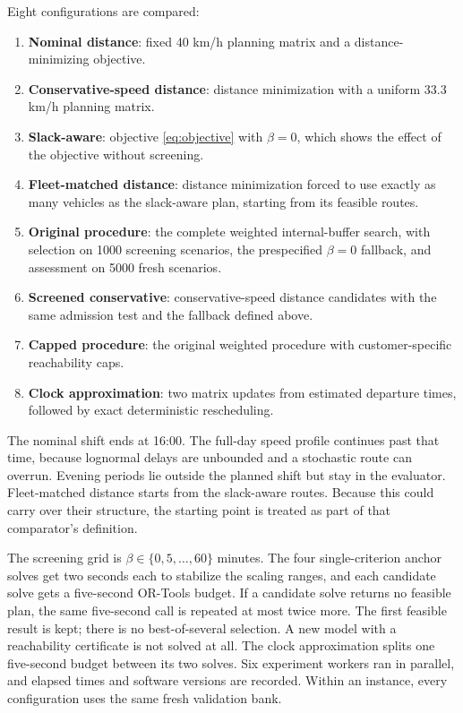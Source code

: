 \documentclass[11pt,a4paper]{article}
\begin{document}
Eight configurations are compared:
\begin{enumerate}
  \item \textbf{Nominal distance}: fixed 40 km/h planning matrix and a
        distance-minimizing objective.
  \item \textbf{Conservative-speed distance}: distance minimization with a
        uniform 33.3 km/h planning matrix.
  \item \textbf{Slack-aware}: objective \eqref{eq:objective} with $\beta=0$,
        which shows the effect of the objective without screening.
  \item \textbf{Fleet-matched distance}: distance minimization forced to use
        exactly as many vehicles as the slack-aware plan, starting from its
        feasible routes.
  \item \textbf{Original procedure}: the complete weighted internal-buffer search, with
        selection on 1000 screening scenarios, the prespecified $\beta=0$
        fallback, and assessment on 5000 fresh scenarios.
  \item \textbf{Screened conservative}: conservative-speed distance candidates
        with the same admission test and the fallback defined above.
  \item \textbf{Capped procedure}: the original weighted procedure with
        customer-specific reachability caps.
  \item \textbf{Clock approximation}: two matrix updates from estimated
        departure times, followed by exact deterministic rescheduling.
\end{enumerate}

The nominal shift ends at 16:00. The full-day speed profile continues past
that time, because lognormal delays are unbounded and a stochastic route can
overrun. Evening periods lie outside the planned shift but stay in the evaluator.
Fleet-matched distance starts from the slack-aware routes. Because this could
carry over their structure, the starting point is treated as part of that
comparator's definition.

The screening grid is $\beta\in\{0,5,\ldots,60\}$ minutes. The four
single-criterion anchor solves get two seconds each to stabilize the scaling
ranges, and each candidate solve gets a five-second OR-Tools budget. If a
candidate solve returns no feasible plan, the same five-second call is repeated
at most twice more. The first feasible result is kept; there is no best-of-several
selection. A new model with a reachability certificate is not solved at all. The
clock approximation splits one five-second budget between its two solves. Six
experiment workers ran in parallel, and elapsed times and software versions are
recorded. Within an instance, every configuration uses the same fresh validation
bank.
\end{document}
